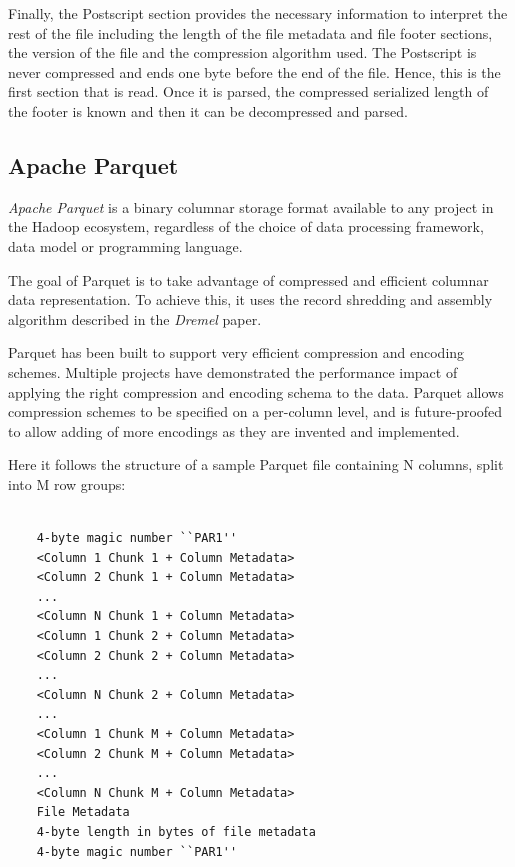 \documentclass[10pt, a4paper]{report}
\begin{document}
Finally, the Postscript section provides the necessary information to interpret the rest of the file including the length of the file metadata and file footer sections, the version of the file and the compression algorithm used. The Postscript is never compressed and ends one byte before the end of the file. Hence, this is the first section that is read. Once it is parsed, the compressed serialized length of the footer is known and then it can be decompressed and parsed.

\subsection{Apache Parquet}

\textit{Apache Parquet} is a binary columnar storage format available to any project in the Hadoop ecosystem, regardless of the choice of data processing framework, data model or programming language\cite{parquet_homepage}.

The goal of Parquet is to take advantage of compressed and efficient columnar data representation. To achieve this, it uses the record shredding and assembly algorithm described in the \textit{Dremel} paper\cite{dremel_paper}.

Parquet has been built to support very efficient compression and encoding schemes. Multiple projects have demonstrated the performance impact of applying the right compression and encoding schema to the data. Parquet allows compression schemes to be specified on a per-column level, and is future-proofed to allow adding of more encodings as they are invented and implemented\cite{parquet_documentation}.

Here it follows the structure of a sample Parquet file containing N columns, split into M row groups: \\

\begin{minipage}{0.92\textwidth}
	\lstset{language=text}
	\begin{lstlisting}
                    
    4-byte magic number ``PAR1''
    <Column 1 Chunk 1 + Column Metadata>
    <Column 2 Chunk 1 + Column Metadata>
    ...
    <Column N Chunk 1 + Column Metadata>
    <Column 1 Chunk 2 + Column Metadata>
    <Column 2 Chunk 2 + Column Metadata>
    ...
    <Column N Chunk 2 + Column Metadata>
    ...
    <Column 1 Chunk M + Column Metadata>
    <Column 2 Chunk M + Column Metadata>
    ...
    <Column N Chunk M + Column Metadata>
    File Metadata
    4-byte length in bytes of file metadata
    4-byte magic number ``PAR1''
                \end{lstlisting}
\end{minipage} \\
\\
\end{document}
